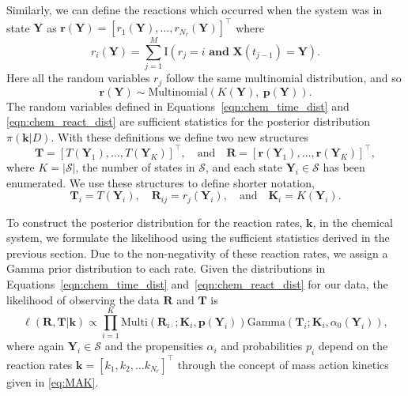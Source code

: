 Similarly, we can define the reactions which occurred when the system was in state $\mathbf{Y}$ as $\mathbf{r}(\mathbf{Y}) = [r_1(\mathbf{Y}), \ldots, r_{N_r}(\mathbf{Y})]^\top$ where
\begin{equation}
	r_i(\mathbf{Y}) = \sum\limits_{j=1}^M \text{I}(r_j = i \textbf{ and }\mathbf{X}(t_{j-1}) = \mathbf{Y}).
\end{equation}
Here all the random variables $r_j$ follow the same multinomial distribution, and so
\begin{equation}\label{eqn:chem_react_dist}
	\mathbf{r}(\mathbf{Y}) \sim \text{Multinomial}(K(\mathbf{Y}),~\mathbf{p}(\mathbf{Y})). 
\end{equation}
The random variables defined in Equations~\eqref{eqn:chem_time_dist} and \eqref{eqn:chem_react_dist} are sufficient statistics for the posterior distribution $\pi(\mathbf{k}|D)$. With these definitions we define two new structures
\begin{equation}
	\mathbf{T} = [T(\mathbf{Y}_1), \dots, T(\mathbf{Y}_K)]^\top, \quad \text{and} \quad \mathbf{R} = [\mathbf{r}(\mathbf{Y}_1), \dots, \mathbf{r}(\mathbf{Y}_K)]^\top,
\end{equation}
where $K = |\mathcal{S}|$, the number of states in $\mathcal{S}$, and each state $\mathbf{Y}_i \in \mathcal{S}$ has been enumerated. We use these structures to define shorter notation,
\begin{equation}
	\mathbf{T}_i = T(\mathbf{Y}_i), \quad \mathbf{R}_{ij} = r_j(\mathbf{Y}_i), \quad \text{and} \quad \mathbf{K}_i = K(\mathbf{Y}_i).
\end{equation}

To construct the posterior distribution for the reaction rates, $\mathbf{k}$, in the chemical system, we formulate the likelihood using the sufficient statistics derived in the previous section. Due to the non-negativity of these reaction rates, we assign a Gamma prior distribution to each rate. Given the distributions in Equations~\eqref{eqn:chem_time_dist} and~\eqref{eqn:chem_react_dist} for our data, the likelihood of observing the data $\mathbf{R}$ and $\mathbf{T}$ is
\begin{equation}
	\ell(\mathbf{R}, \mathbf{T}|\mathbf{k}) \propto \prod\limits_{i=1}^K \text{Multi}(\mathbf{R}_{i\cdot}; \mathbf{K}_i, \mathbf{p}(\mathbf{Y}_i))\text{Gamma}(\mathbf{T}_i; \mathbf{K}_i, \alpha_0(\mathbf{Y}_i)),
\end{equation}
where again $\mathbf{Y}_i \in \mathcal{S}$ and the propensities
$\alpha_i$ and probabilities $p_i$ depend on the reaction rates
$\mathbf{k} = [k_1, k_2, \ldots k_{N_r}]^\top$ through the concept of
mass action kinetics given in \eqref{eq:MAK}.

